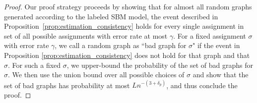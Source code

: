 \documentclass{article}
\begin{document}
\begin{proof}
Our proof strategy proceeds by showing that for almost all random graphs generated according to the labeled SBM model, the event described in Proposition~\ref{prop:estimation_consistency} holds for every single assignment in set of all possible assignments with error rate at most $\gamma$. For a fixed assignment $\sigma$ with error rate $\gamma$, we call a random graph as ``bad graph for $\sigma$" if the event in Proposition \ref{prop:estimation_consistency} does not hold for that graph and that $\sigma$. For such a fixed $\sigma$, we upper-bound the probability of the set of bad graphs for $\sigma$. We then use the union bound over all possible choices of $\sigma$ and show that the set of bad graphs has probability at most $Ln^{-(3+\delta_p)}$, and thus conclude the proof. 


\end{proof}
\end{document}
